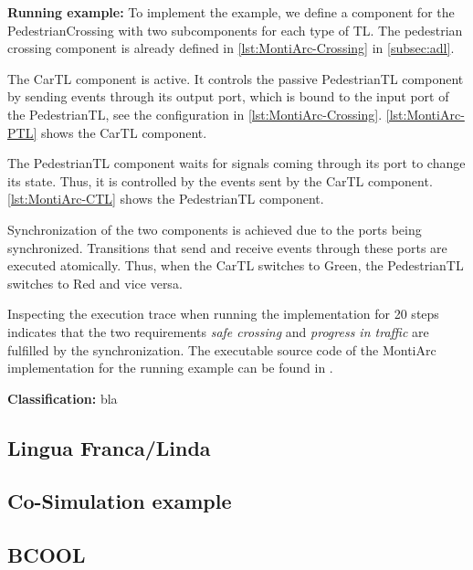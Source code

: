 \documentclass[runningheads]{llncs}
\begin{document}
\textbf{Running example:} To implement the example, we define a component for the \textsf{PedestrianCrossing} with two subcomponents for each type of TL.
The pedestrian crossing component is already defined in \autoref{lst:MontiArc-Crossing} in \autoref{subsec:adl}.

The \textsf{CarTL} component is active.
It controls the passive \textsf{PedestrianTL} component by sending events through its output port, which is bound to the input port of the \textsf{PedestrianTL}, see the configuration in \autoref{lst:MontiArc-Crossing}.
\autoref{lst:MontiArc-PTL} shows the \textsf{CarTL} component.



The \textsf{PedestrianTL} component waits for signals coming through its port to change its state.
Thus, it is controlled by the events sent by the \textsf{CarTL} component.
\autoref{lst:MontiArc-CTL} shows the \textsf{PedestrianTL} component.



Synchronization of the two components is achieved due to the ports being synchronized.
Transitions that send and receive events through these ports are executed atomically.
Thus, when the \textsf{CarTL} switches to \textsf{Green}, the \textsf{PedestrianTL} switches to \textsf{Red} and vice versa.

Inspecting the execution trace when running the implementation for 20 steps indicates that the two requirements \textit{safe crossing} and \textit{progress in traffic} are fulfilled by the synchronization.
The executable source code of the MontiArc implementation for the running example can be found in \cite{timkrauterArtifactsCoordination2024}.

\textbf{Classification:} bla
\subsection{Lingua Franca/Linda} %
\subsection{Co-Simulation example} %
\subsection{BCOOL} %
\end{document}
